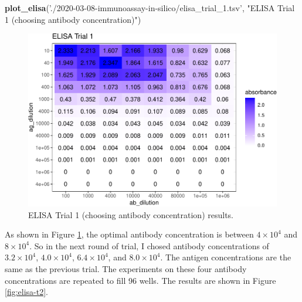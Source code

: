 \documentclass[
]{article}
\newenvironment{Shaded}{\begin{snugshade}}{\end{snugshade}}
\newcommand{\KeywordTok}[1]{\textcolor[rgb]{0.13,0.29,0.53}{\textbf{#1}}}
\newcommand{\NormalTok}[1]{#1}
\newcommand{\StringTok}[1]{\textcolor[rgb]{0.31,0.60,0.02}{#1}}
\begin{document}
\begin{Shaded}
\begin{Highlighting}[]
\KeywordTok{plot_elisa}\NormalTok{(}\StringTok{'./2020-03-08-immunoassay-in-silico/elisa_trial_1.tsv'}\NormalTok{, }\StringTok{"ELISA Trial 1 (choosing antibody concentration)"}\NormalTok{)}
\end{Highlighting}
\end{Shaded}

\begin{figure}
\includegraphics[width=1\linewidth]{2020-03-08-immunoassay-in-silico_files/figure-latex/elisa-t1-1} \caption{ELISA Trial 1 (choosing antibody concentration) results.}\label{fig:elisa-t1}
\end{figure}

As shown in Figure \ref{fig:elisa-t1}, the optimal antibody concentration is between \(4\times10^4\) and \(8\times10^4\). So in the next round of trial, I chosed antibody concentrations of \(3.2\times10^4\), \(4.0\times10^4\), \(6.4\times10^4\), and \(8.0\times10^4\). The antigen concentrations are the same as the previous trial. The experiments on these four antibody concentrations are repeated to fill 96 wells. The results are shown in Figure \ref{fig:elisa-t2}.
\end{document}
